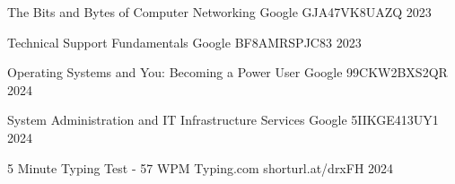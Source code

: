 

\begin{cvhonors}

  \cvhonor
    {The Bits and Bytes of Computer Networking} %
    {Google} %
    {GJA47VK8UAZQ} %
    {2023} %

  \cvhonor
    {Technical Support Fundamentals} %
    {Google} %
    {BF8AMRSPJC83} %
    {2023} %

  \cvhonor
    {Operating Systems and You: Becoming a Power User} %
    {Google} %
    {99CKW2BXS2QR} %
    {2024} %

  \cvhonor
    {System Administration and IT Infrastructure Services} %
    {Google} %
    {5IIKGE413UY1} %
    {2024} %

  \cvhonor
    {5 Minute Typing Test - 57 WPM} %
    {Typing.com} %
    {shorturl.at/drxFH} %
    {2024} %

\end{cvhonors}
